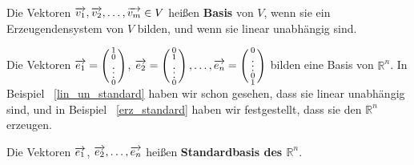 \bigbreak

\begin{definition} Die Vektoren $\overrightarrow{v_1}, \overrightarrow{v_2}, \ldots, 
\overrightarrow{v_m} \in V$ heißen  \textbf{Basis} von $V$, wenn 
sie ein Erzeugendensystem von $V$ bilden, 
und wenn sie linear unabhängig sind.
\end{definition}

\begin{beispiel}\label{uvr_standard_basis} Die Vektoren  $\overrightarrow{e_1} = 
\left( \begin{smallmatrix} 1 \\ 0 \\ \vdots \\ 0
\end{smallmatrix} \right)$, $\overrightarrow{e_2} = \left( \begin{smallmatrix} 0 \\ 1 \\ \vdots \\ 0 
\end{smallmatrix} \right), \ldots , \overrightarrow{e_n} = \left( \begin{smallmatrix} 0 \\ \vdots \\ 0 \\ 1 
\end{smallmatrix} \right)$ bilden eine Basis von $\mathbb R^n$. In Beispiel ~\ref{lin_un_standard} haben wir 
schon gesehen, dass sie linear unabhängig sind, und in Beispiel ~\ref{erz_standard} haben wir festgestellt, 
dass sie den $\mathbb R^n$ erzeugen. 

Die Vektoren $\overrightarrow{e_1}$, $\overrightarrow{e_2}, \ldots , \overrightarrow{e_n}$ heißen 
 \textbf{Standardbasis des $\mathbb R^n$}.
\end{beispiel}

